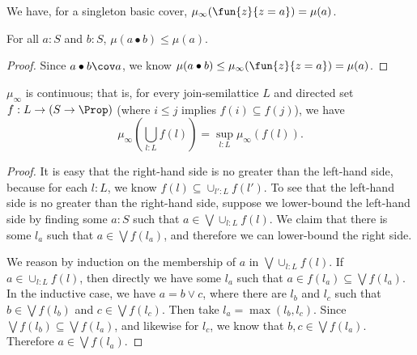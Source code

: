 \begin{lemma}
We have, for a singleton basic cover, $\mu_\infty(\fun{z}{z = a}) = \mu(a)$.
\end{lemma}

\begin{lemma}
For all $a : S$ and $b : S$, $\mu(a \bullet b) \le \mu(a)$.
\end{lemma}
\begin{proof}
Since $a \bullet b \cov a$, we know $\mu(a \bullet b) \le \mu_\infty(\fun{z}{z = a}) = \mu(a)$.
\end{proof}

\begin{lemma}
$\mu_\infty$ is continuous; that is, for every join-semilattice $L$ and directed set $f : L \to (S \to \Prop)$ (where $i \le j$ implies $f(i) \subseteq f(j)$), we have
\[
\mu_\infty\left(\bigcup_{l : L} f(l)\right) = \sup_{l : L} \mu_\infty(f(l)).
\]
\end{lemma}
\begin{proof}
It is easy that the right-hand side is no greater than the left-hand side, because for each $l : L$, we know $f(l) \subseteq \cup_{l' : L} f(l')$. To see that the left-hand side is no greater than the right-hand side, suppose we lower-bound the left-hand side by finding some $a : S$ such that $a \in \bigvee \cup_{l : L} f(l)$. We claim that there is some $l_a$ such that $a \in \bigvee f(l_a)$, and therefore we can lower-bound the right side. 

We reason by induction on the membership of $a$ in $\bigvee \cup_{l : L} f(l)$. If $a \in \cup_{l : L} f(l)$, then directly we have some $l_a$ such that $a \in f(l_a) \subseteq \bigvee f(l_a)$. In the inductive case, we have $a = b \vee c$, where there are $l_b$ and $l_c$ such that $b \in \bigvee f(l_b)$ and $c \in \bigvee f(l_c)$. Then take $l_a = \max(l_b, l_c)$. Since $\bigvee f(l_b) \subseteq \bigvee f(l_a)$, and likewise for $l_c$, we know that $b, c \in \bigvee f(l_a)$. Therefore $a \in \bigvee f(l_a)$.
\end{proof}


